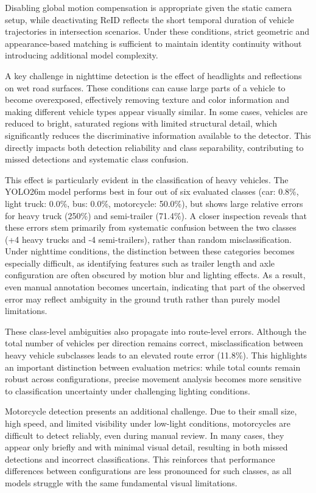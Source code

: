 Disabling global motion compensation is appropriate given the static camera setup, while deactivating ReID reflects the short temporal duration of vehicle trajectories in intersection scenarios. Under these conditions, strict geometric and appearance-based matching is sufficient to maintain identity continuity without introducing additional model complexity.

A key challenge in nighttime detection is the effect of headlights and reflections on wet road surfaces. These conditions can cause large parts of a vehicle to become overexposed, effectively removing texture and color information and making different vehicle types appear visually similar. In some cases, vehicles are reduced to bright, saturated regions with limited structural detail, which significantly reduces the discriminative information available to the detector. This directly impacts both detection reliability and class separability, contributing to missed detections and systematic class confusion.

This effect is particularly evident in the classification of heavy vehicles. The YOLO26m model performs best in four out of six evaluated classes (car: 0.8\%, light truck: 0.0\%, bus: 0.0\%, motorcycle: 50.0\%), but shows large relative errors for heavy truck (250\%) and semi-trailer (71.4\%). A closer inspection reveals that these errors stem primarily from systematic confusion between the two classes (+4 heavy trucks and -4 semi-trailers), rather than random misclassification. Under nighttime conditions, the distinction between these categories becomes especially difficult, as identifying features such as trailer length and axle configuration are often obscured by motion blur and lighting effects. As a result, even manual annotation becomes uncertain, indicating that part of the observed error may reflect ambiguity in the ground truth rather than purely model limitations.

These class-level ambiguities also propagate into route-level errors. Although the total number of vehicles per direction remains correct, misclassification between heavy vehicle subclasses leads to an elevated route error (11.8\%). This highlights an important distinction between evaluation metrics: while total counts remain robust across configurations, precise movement analysis becomes more sensitive to classification uncertainty under challenging lighting conditions.

Motorcycle detection presents an additional challenge. Due to their small size, high speed, and limited visibility under low-light conditions, motorcycles are difficult to detect reliably, even during manual review. In many cases, they appear only briefly and with minimal visual detail, resulting in both missed detections and incorrect classifications. This reinforces that performance differences between configurations are less pronounced for such classes, as all models struggle with the same fundamental visual limitations.

